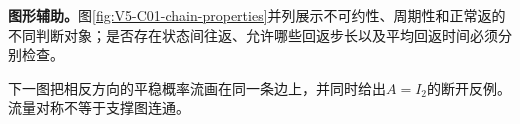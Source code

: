 \documentclass[UTF8,a4paper,11pt,openany]{ctexbook}
\begin{document}
\setcounter{page}{709}
\setcounter{chapter}{30}
\setcounter{figure}{4}
\pagestyle{headings}
\textbf{图形辅助。}图\ref{fig:V5-C01-chain-properties}并列展示不可约性、周期性和正常返的不同判断对象；是否存在状态间往返、允许哪些回返步长以及平均回返时间必须分别检查。

下一图把相反方向的平稳概率流画在同一条边上，并同时给出$A=I_2$的断开反例。流量对称不等于支撑图连通。
\end{document}
